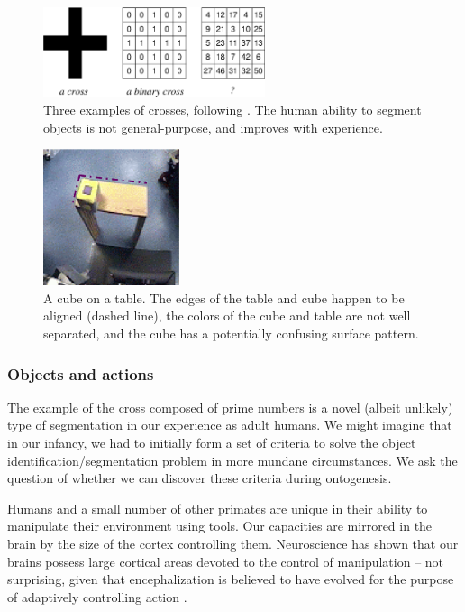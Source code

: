 %
\begin{figure}[tb]
\begin{center}
\includegraphics[width=6.5cm]{number-cross.eps}
\caption{ 
\label{fig:number-cross}
%
Three examples of crosses, following \cite{manzotti01coscienza}.  The
human ability to segment objects is not general-purpose, and improves
with experience.
%
}
\end{center}
\end{figure}
%
%
\begin{figure}[tb]
\begin{center}
\includegraphics[width=4cm]{setup-sequence.eps}
\caption{ 
\label{fig:setup-sequence}
%
A cube on a table. The edges of the table and cube happen to be
aligned (dashed line), the colors of the cube and table are not well
separated, and the cube has a potentially confusing surface pattern.
%
}
\end{center}
\end{figure}

\subsubsection*{Objects and actions}

The example of the cross composed of prime numbers is a novel (albeit
unlikely) type of segmentation in our experience as adult humans. We
might imagine that in our infancy, we had to initially form a set of
criteria to solve the object identification/segmentation problem
in more mundane circumstances.  We ask the question of whether we can
discover these criteria during ontogenesis.

Humans and a small number of other primates are unique in their
ability to manipulate their environment using tools.
Our capacities are mirrored in the brain by the size of
the cortex controlling them.  Neuroscience has shown that our brains
possess large cortical areas devoted to the control of manipulation --
not surprising, given that encephalization is believed to have evolved
for the purpose of adaptively controlling
action \cite{maturana98tree}.

